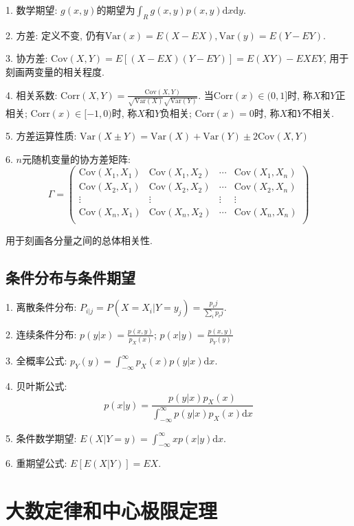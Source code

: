1. 数学期望: $g(x,y)$的期望为$\int_R g(x,y)p(x,y)\mathrm{d}x\mathrm{d}y$.

2. 方差: 定义不变, 仍有$\text{Var}(x)=E(X-EX),\text{Var}(y)=E(Y-EY)$.

3. 协方差: $\text{Cov}(X,Y)=E[(X-EX)(Y-EY)]=E(XY)-EXEY$, 用于刻画两变量的相关程度.

4. 相关系数: $\text{Corr}(X,Y)=\frac{\text{Cov}(X,Y)}{\sqrt{\text{Var}(X)}\sqrt{\text{Var}(Y)}}$. 当$\text{Corr}(x)\in (0,1]$时, 称$X$和$Y$正相关; $\text{Corr}(x)\in [-1,0)$时, 称$X$和$Y$负相关; $\text{Corr}(x)=0$时, 称$X$和$Y$不相关.

5. 方差运算性质: $\text{Var}(X\pm Y)=\text{Var}(X)+\text{Var}(Y)\pm 2\text{Cov}(X,Y)$

6. $n$元随机变量的协方差矩阵: \begin{equation*}
    \Gamma=\begin{pmatrix}
        \text{Cov}(X_1,X_1) & \text{Cov}(X_1,X_2)&\cdots&\text{Cov}(X_1,X_n)\\
        \text{Cov}(X_2,X_1) & \text{Cov}(X_2,X_2)&\cdots&\text{Cov}(X_2,X_n)\\
        \vdots &\vdots &\vdots &\vdots \\
        \text{Cov}(X_n,X_1) & \text{Cov}(X_n,X_2)&\cdots&\text{Cov}(X_n,X_n)\\
    \end{pmatrix}
\end{equation*}

用于刻画各分量之间的总体相关性.

\subsection{条件分布与条件期望}

1. 离散条件分布: $P_{i|j}=P(X=X_i|Y=y_j)=\frac{p_ij}{\sum\limits_i p_ij}$.

2. 连续条件分布: $p(y|x)=\frac{p(x,y)}{p_X(x)}$; $p(x|y)=\frac{p(x,y)}{p_Y(y)}$ 

3. 全概率公式: $p_Y(y)=\int_{-\infty}^\infty p_X(x)p(y|x)\mathrm{d}x$.

4. 贝叶斯公式: \begin{equation*}
    p(x|y)=\frac{p(y|x)p_X(x)}{\int_{-\infty}^\infty p(y|x)p_X(x)\mathrm{d}x}
\end{equation*}

5. 条件数学期望: $E(X|Y=y)=\int_{-\infty}^\infty xp(x|y)\mathrm{d}x$.

6. 重期望公式: $E[E(X|Y)]=EX$.

\section{大数定律和中心极限定理}

